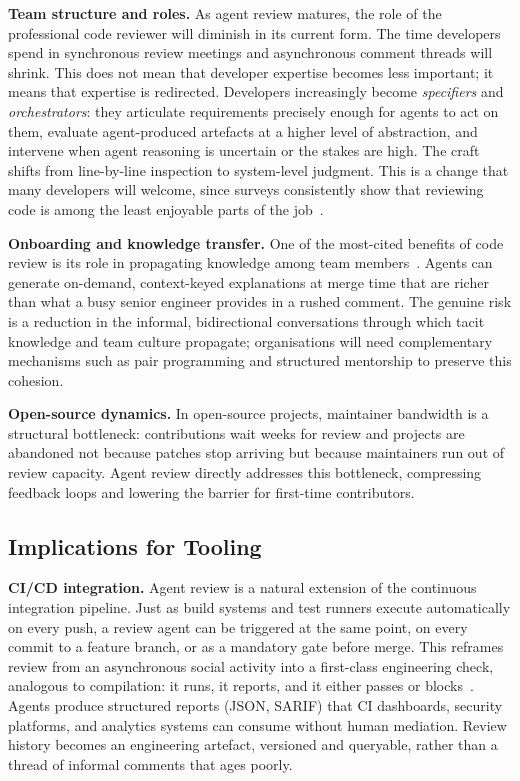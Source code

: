 \documentclass[10pt,conference]{IEEEtran}
\begin{document}
\textbf{Team structure and roles.}
As agent review matures, the role of the professional code reviewer will diminish in its current form.
The time developers spend in synchronous review meetings and asynchronous comment threads will shrink.
This does not mean that developer expertise becomes less important; it means that expertise is redirected.
Developers increasingly become \emph{specifiers} and \emph{orchestrators}: they articulate requirements precisely enough for agents to act on them, evaluate agent-produced artefacts at a higher level of abstraction, and intervene when agent reasoning is uncertain or the stakes are high.
The craft shifts from line-by-line inspection to system-level judgment.
This is a change that many developers will welcome, since surveys consistently show that reviewing code is among the least enjoyable parts of the job~\cite{sadowski2018modern}.

\textbf{Onboarding and knowledge transfer.}
One of the most-cited benefits of code review is its role in propagating knowledge among team members~\cite{bacchelli2013expectations}.
Agents can generate on-demand, context-keyed explanations at merge time that are richer than what a busy senior engineer provides in a rushed comment.
The genuine risk is a reduction in the informal, bidirectional conversations through which tacit knowledge and team culture propagate; organisations will need complementary mechanisms such as pair programming and structured mentorship to preserve this cohesion.

\textbf{Open-source dynamics.}
In open-source projects, maintainer bandwidth is a structural bottleneck: contributions wait weeks for review and projects are abandoned not because patches stop arriving but because maintainers run out of review capacity.
Agent review directly addresses this bottleneck, compressing feedback loops and lowering the barrier for first-time contributors.

\subsection{Implications for Tooling}
\label{sec:tooling}

\textbf{CI/CD integration.}
Agent review is a natural extension of the continuous integration pipeline.
Just as build systems and test runners execute automatically on every push, a review agent can be triggered at the same point, on every commit to a feature branch, or as a mandatory gate before merge.
This reframes review from an asynchronous social activity into a first-class engineering check, analogous to compilation: it runs, it reports, and it either passes or blocks~\cite{shahin2017continuous}.
Agents produce structured reports (JSON, SARIF) that CI dashboards, security platforms, and analytics systems can consume without human mediation.
Review history becomes an engineering artefact, versioned and queryable, rather than a thread of informal comments that ages poorly.
\end{document}
